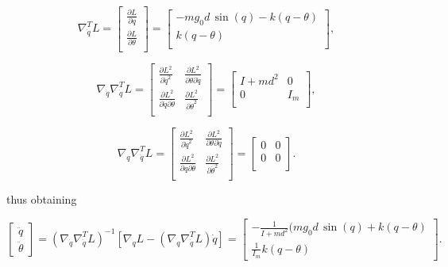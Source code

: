 \documentclass[a4paper]{article}
\begin{document}
\begin{equation}
    \nonumber
    \nabla_{\dot{q}}^{T} L = 
    \begin{bmatrix}
        \frac{\partial L}{\partial q} \\[3mm]
        \frac{\partial L}{\partial \theta} \\
    \end{bmatrix} =
    \begin{bmatrix}
        -mg_0d\,\sin(q) - k(q-\theta) \\
        k(q-\theta)\\
    \end{bmatrix},
\end{equation}

\begin{equation}
    \nonumber
    \nabla_{\dot{q}} \nabla_{\dot{q}}^{T} L =
    \begin{bmatrix}
        \frac{\partial L^2}{\partial \dot{q}^2} & \frac{\partial L^2}{\partial \dot{\theta} \partial \dot{q}} \\
        \frac{\partial L^2}{\partial \dot{q} \partial \dot{\theta}} & \frac{\partial L^2}{\partial \dot{\theta}^2} \\
    \end{bmatrix} =
    \begin{bmatrix}
        I+md^2 & 0 \\
        0 & I_m \\
    \end{bmatrix},
\end{equation}

\begin{equation}
    \nonumber
    \nabla_{q} \nabla_{\dot{q}}^{T} L =
    \begin{bmatrix}
        \frac{\partial L^2}{\partial \dot{q}^2} & \frac{\partial L^2}{\partial \theta \partial \dot{q}} \\
        \frac{\partial L^2}{\partial q \partial \dot{\theta}} & \frac{\partial L^2}{\partial \dot{\theta}^2} \\
    \end{bmatrix} =
    \begin{bmatrix}
        0 & 0 \\
        0 & 0 \\
    \end{bmatrix}.
\end{equation}


thus obtaining

\begin{equation}
    \label{eq:rig_eul_lag_7}
    \nonumber
    \begin{bmatrix}    
        \ddot{q} \\
        \ddot{\theta}
    \end{bmatrix} = (\nabla_{\dot{q}}\nabla_{\dot{q}}^T L)^{-1} [\nabla_{q} L - (\nabla_{q}\nabla_{\dot{q}}^T L)\dot{q}] =
    \begin{bmatrix}
        -\frac{1}{I+md^2} (mg_0d\, \sin(q) + k(q-\theta)\\
        \frac{1}{I_m} k(q-\theta)
    \end{bmatrix}.
\end{equation}
\end{document}
